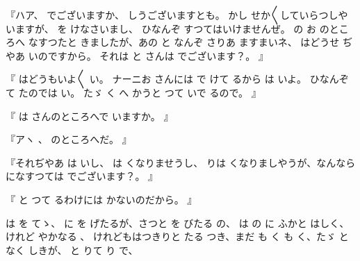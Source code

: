 『ハア、
でございますか、
しうございますとも。
かし
せか〳〵していらつしやいますが、
を
けなさいまし、
ひなんぞ
すつてはいけませんぜ。
の
お
のところへ
なすつたと
きましたが、あの
と
なんぞ
さりあ
ますまいネ、
はどうせ
ぢやあ
いのですから。
それは
と
さんは
でございます？。
』

『
はどうもいよ〳〵
い。
ナーニお
さんには
で
けて
るから
は
いよ。
ひなんぞ
て
たのでは
い。
たゞ
く
へ
かうと
つて
いで
るので。
』

『
は
さんのところへで
いますか。
』

『アヽ
、
のところへだ。
』

『それぢやあ
は
いし、
は
くなりませうし、
りは
くなりましやうが、なんなら
になすつては
でございます？。
』

『
と
つて
るわけには
かないのだから。
』

は
を
てゝ、
に
を
げたるが、さつと
を
びたる
の、
は
の
に
ふかと
はしく、
けれど
やかなる
、
けれどもはつきりと
たる
つき、まだ
も
く
も
く、たゞ
と
なく
しきが、
と
りて
り
で、

